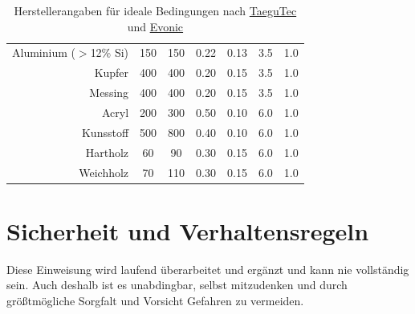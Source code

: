 \documentclass{\basedir/fablab-document}
\begin{document}
\begin{table}
\begin{tabular}{rcccccc}
	Aluminium	($>$12\% Si)			& 150	 	& 150  	& 0.22 	& 0.13	& 3.5 	& 1.0 	\\
	Kupfer											& 400	 	& 400  	& 0.20 	& 0.15	& 3.5 	& 1.0 	\\
	Messing											& 400	 	& 400  	& 0.20 	& 0.15	& 3.5 	& 1.0 	\\
	Acryl												& 200	 	& 300 	& 0.50 	& 0.10	& 6.0 	& 1.0 	\\
	Kunsstoff										& 500	 	& 800 	& 0.40 	& 0.10	& 6.0 	& 1.0 	\\
	Hartholz										& 60	 	& 90  	& 0.30 	& 0.15	& 6.0 	& 1.0 	\\
	Weichholz										& 70	 	& 110  	& 0.30 	& 0.15	& 6.0 	& 1.0 	\\
\end{tabular}
\caption{Herstellerangaben für ideale Bedingungen nach \href{http://www.taegutec.com/Ustyles/DownloadFiles/I_Grades_en.pdf}{TaeguTec} und \href{http://www.roehmschweiz.ch/fileadmin/Roehm/PDF_Plexiglas/311-1_Bearbeiten_von_PLEXIGLAS_de.pdf}{Evonic}}
\end{table}

\newpage
\section{Sicherheit und Verhaltensregeln}

Diese Einweisung wird laufend überarbeitet und ergänzt und kann nie vollständig sein. Auch deshalb ist es unabdingbar, selbst mitzudenken und durch größtmögliche Sorgfalt und Vorsicht Gefahren zu vermeiden.
\end{document}
